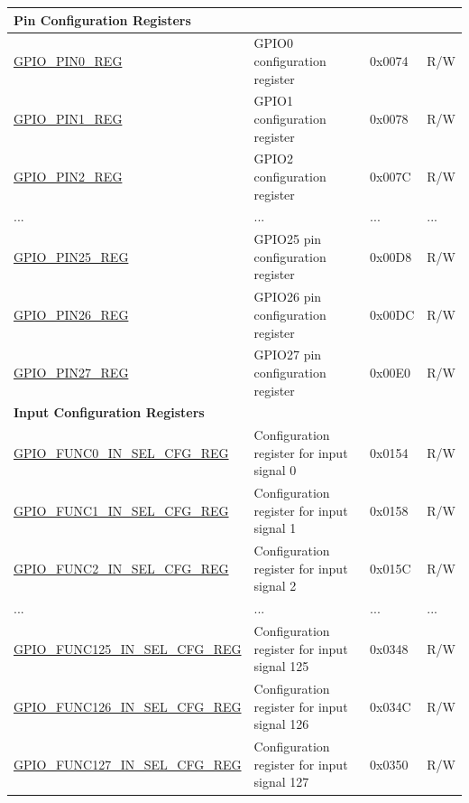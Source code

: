 \begin{longtable}{ | p{5.8cm} | p{7.2cm} | p{1.3cm} | p{2cm} | }
\multicolumn{4}{|l|}{\textbf{Pin Configuration Registers}} \\ \hline
\hyperref[regdesc:GPIOPINNREG]{GPIO\_PIN0\_REG} & GPIO0 configuration register & 0x0074 & R/W \\ \hline
\hyperref[regdesc:GPIOPINNREG]{GPIO\_PIN1\_REG} & GPIO1 configuration register & 0x0078 & R/W \\ \hline
\hyperref[regdesc:GPIOPINNREG]{GPIO\_PIN2\_REG} & GPIO2 configuration register & 0x007C & R/W \\ \hline
...& ... & ... & ... \\ \hline
\hyperref[regdesc:GPIOPINNREG]{GPIO\_PIN25\_REG} & GPIO25 pin configuration register & 0x00D8 & R/W \\ \hline
\hyperref[regdesc:GPIOPINNREG]{GPIO\_PIN26\_REG} & GPIO26 pin configuration register & 0x00DC & R/W \\ \hline
\hyperref[regdesc:GPIOPINNREG]{GPIO\_PIN27\_REG} & GPIO27 pin configuration register & 0x00E0 & R/W \\ \hline




\multicolumn{4}{|l|}{\textbf{Input Configuration Registers}} \\ \hline
\hyperref[regdesc:GPIOFUNCNINSELCFGREG]{GPIO\_FUNC0\_IN\_SEL\_CFG\_REG} & Configuration register for input signal 0 & 0x0154 & R/W \\ \hline
\hyperref[regdesc:GPIOFUNCNINSELCFGREG]{GPIO\_FUNC1\_IN\_SEL\_CFG\_REG} & Configuration register for input signal 1 & 0x0158 & R/W \\ \hline
\hyperref[regdesc:GPIOFUNCNINSELCFGREG]{GPIO\_FUNC2\_IN\_SEL\_CFG\_REG} & Configuration register for input signal 2 & 0x015C & R/W \\ \hline
...& ... & ... & ... \\ \hline
\hyperref[regdesc:GPIOFUNCNINSELCFGREG]{GPIO\_FUNC125\_IN\_SEL\_CFG\_REG} & Configuration register for input signal 125 & 0x0348 & R/W \\ \hline
\hyperref[regdesc:GPIOFUNCNINSELCFGREG]{GPIO\_FUNC126\_IN\_SEL\_CFG\_REG} & Configuration register for input signal 126 & 0x034C & R/W \\ \hline
\hyperref[regdesc:GPIOFUNCNINSELCFGREG]{GPIO\_FUNC127\_IN\_SEL\_CFG\_REG} & Configuration register for input signal 127 & 0x0350 & R/W \\ \hline


\end{longtable}
